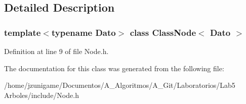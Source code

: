 \subsection{Detailed Description}
\subsubsection*{template$<$typename Dato$>$\newline
class Class\+Node$<$ Dato $>$}



Definition at line 9 of file Node.\+h.



The documentation for this class was generated from the following file\+:\begin{DoxyCompactItemize}
\item 
/home/jzunigame/\+Documentos/\+A\+\_\+\+Algoritmos/\+A\+\_\+\+Git/\+Laboratorios/\+Lab5 Arboles/include/Node.\+h\end{DoxyCompactItemize}
